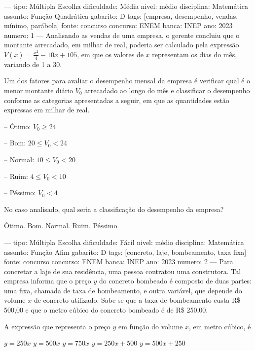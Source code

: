 
---
tipo: Múltipla Escolha
dificuldade: Média
nivel: médio
disciplina: Matemática
assunto: Função Quadrática
gabarito: D
tags: [empresa, desempenho, vendas, mínimo, parábola]
fonte: concurso
concurso: ENEM
banca: INEP
ano: 2023
numero: 1
---
\question
Analisando as vendas de uma empresa, o gerente concluiu que o montante arrecadado, em milhar de real, poderia ser calculado pela expressão \( V(x) = \frac{x^2}{4} - 10x + 105 \), em que os valores de \( x \) representam os dias do mês, variando de 1 a 30.

Um dos fatores para avaliar o desempenho mensal da empresa é verificar qual é o menor montante diário \( V_0 \) arrecadado ao longo do mês e classificar o desempenho conforme as categorias apresentadas a seguir, em que as quantidades estão expressas em milhar de real.

-- Ótimo: \( V_0 \geq 24 \)

-- Bom: \( 20 \leq V_0 < 24 \)

-- Normal: \( 10 \leq V_0 < 20 \)

-- Ruim: \( 4 \leq V_0 < 10 \)

-- Péssimo: \( V_0 < 4 \)

No caso analisado, qual seria a classificação do desempenho da empresa?
\begin{choices}
\choice Ótimo.
\choice Bom.
\choice Normal.
\correctchoice Ruim.
\choice Péssimo.
\end{choices}

---
tipo: Múltipla Escolha
dificuldade: Fácil
nivel: médio
disciplina: Matemática
assunto: Função Afim
gabarito: D
tags: [concreto, laje, bombeamento, taxa fixa]
fonte: concurso
concurso: ENEM
banca: INEP
ano: 2023
numero: 2
---
\question
Para concretar a laje de sua residência, uma pessoa contratou uma construtora. Tal empresa informa que o preço \( y \) do concreto bombeado é composto de duas partes: uma fixa, chamada de taxa de bombeamento, e outra variável, que depende do volume \( x \) de concreto utilizado. Sabe-se que a taxa de bombeamento custa R\$ 500,00 e que o metro cúbico do concreto bombeado é de R\$ 250,00.

A expressão que representa o preço \( y \) em função do volume \( x \), em metro cúbico, é
\begin{oneparchoices}
\choice \( y = 250x \)
\choice \( y = 500x \)
\choice \( y = 750x \)
\correctchoice \( y = 250x + 500 \)
\choice \( y = 500x + 250 \)
\end{oneparchoices}

